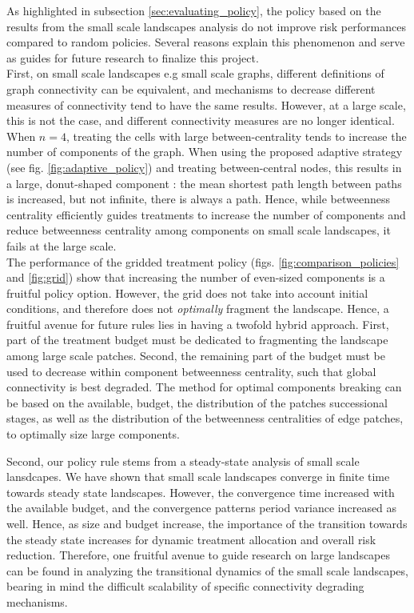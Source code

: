 As highlighted in subsection \ref{sec:evaluating_policy}, the policy based on the results from the small scale landscapes analysis do not improve risk performances compared to random policies. Several reasons explain this phenomenon and serve as guides for future research to finalize this project. 
\\
First, on small scale landscapes e.g small scale graphs, different definitions of graph connectivity can be equivalent, and mechanisms to decrease different measures of connectivity tend to have the same results. However, at a large scale, this is not the case, and different connectivity measures are no longer identical. When $n=4$, treating the cells with large between-centrality tends to increase the number of components of the graph. When using the proposed adaptive strategy (see fig. \ref{fig:adaptive_policy}) and treating between-central nodes, this results in a large, donut-shaped component : the mean shortest path length between paths is increased, but not infinite, there is always a path. Hence, while betweenness centrality efficiently guides treatments to increase the number of components and reduce betweenness centrality among components on small scale landscapes, it fails at the large scale. 
\\
The performance of the gridded treatment policy (figs. \ref{fig:comparison_policies} and \ref{fig:grid}) show that increasing the number of even-sized components is a fruitful policy option. However, the grid does not take into account initial conditions, and therefore does not \textit{optimally} fragment the landscape. Hence, a fruitful avenue for future rules lies in having a twofold hybrid approach. First, part of the treatment budget must be dedicated to fragmenting the landscape among large scale patches. Second, the remaining part of the budget must be used to decrease within component betweenness centrality, such that global connectivity is best degraded. The method for optimal components breaking can be based on the available, budget, the distribution of the patches successional stages, as well as the distribution of the betweenness centralities of edge patches, to optimally size large components. 

Second, our policy rule stems from a steady-state analysis of small scale lansdcapes. We have shown that small scale landscapes converge in finite time towards steady state landscapes. However, the convergence time increased with the available budget, and the convergence patterns period variance increased as well. Hence, as size and budget increase, the importance of the transition towards the steady state increases for dynamic treatment allocation and overall risk reduction. Therefore, one fruitful avenue to guide research on large landscapes can be found in analyzing the transitional dynamics of the small scale landscapes, bearing in mind the difficult scalability of specific connectivity degrading mechanisms. 


